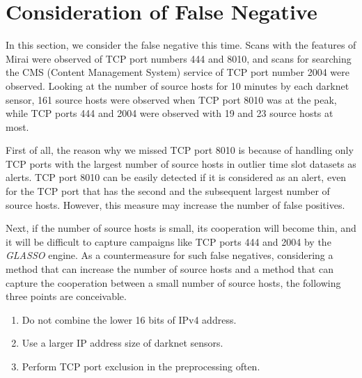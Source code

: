 \documentclass[conference]{IEEEtran}
\begin{document}
\section{Consideration of False Negative}
\label{Consideration}
In this section, we consider the false negative this time.
Scans with the features of Mirai were observed of TCP port numbers 444 and 8010, and scans for searching the CMS (Content Management System) service of TCP port number 2004 were observed.
Looking at the number of source hosts for 10 minutes by each darknet sensor, 161 source hosts were observed when TCP port 8010 was at the peak, while TCP ports 444 and 2004 were observed with 19 and 23 source hosts at most.


First of all, the reason why we missed TCP port 8010 is because of handling only TCP ports with the largest number of source hosts in outlier time slot datasets as alerts.
TCP port 8010 can be easily detected if it is considered as an alert, even for the TCP port that has the second and the subsequent largest number of source hosts.
However, this measure may increase the number of false positives.



Next, if the number of source hosts is small, its cooperation will become thin, and it will be difficult to capture campaigns like TCP ports 444 and 2004 by the \textit{GLASSO} engine.
As a countermeasure for such false negatives, considering a method that can increase the number of source hosts and a method that can capture the cooperation between a small number of source hosts, the following three points are conceivable.
\begin{enumerate}
  \item Do not combine the lower 16 bits of IPv4 address.
  \item Use a larger IP address size of darknet sensors.
  \item Perform TCP port exclusion in the preprocessing often.
\end{enumerate}
\end{document}
